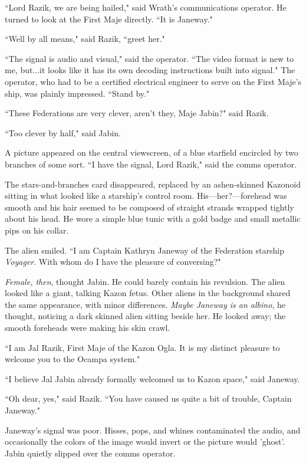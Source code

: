 \documentclass[twoside,letterpaper,12pt]{memoir}
\begin{document}
``Lord Razik, we are being hailed," said Wrath's communications operator. He turned to look at the First Maje directly. ``It is Janeway."

``Well by all means," said Razik, ``greet her."

``The signal is audio and visual," said the operator. ``The video format is new to me, but...it looks like it has its own decoding instructions built into signal." The operator, who had to be a certified electrical engineer to serve on the First Maje's ship, was plainly impressed. ``Stand by."

``These Federations are very clever, aren't they, Maje Jabin?" said Razik.

``Too clever by half," said Jabin.

A picture appeared on the central viewscreen, of a blue starfield encircled by two branches of some sort. ``I have the signal, Lord Razik," said the comms operator.

The stars-and-branches card disappeared, replaced by an ashen-skinned Kazonoid sitting in what looked like a starship's control room. His---her?---forehead was smooth and his hair seemed to be composed of straight strands wrapped tightly about his head. He wore a simple blue tunic with a gold badge and small metallic pips on his collar.

The alien smiled. ``I am Captain Kathryn Janeway of the Federation starship \textit{Voyager}. With whom do I have the pleasure of conversing?"

\textit{Female, then}, thought Jabin. He could barely contain his revulsion. The alien looked like a giant, talking Kazon fetus. Other aliens in the background shared the same appearance, with minor differences. \textit{Maybe Janeway is an albino}, he thought, noticing a dark skinned alien sitting beside her. He looked away; the smooth foreheads were making his skin crawl.

``I am Jal Razik, First Maje of the Kazon Ogla. It is my distinct pleasure to welcome you to the Ocampa system."

``I believe Jal Jabin already formally welcomed us to Kazon space," said Janeway.

``Oh dear, yes," said Razik. ``You have caused us quite a bit of trouble, Captain Janeway."

Janeway's signal was poor. Hisses, pops, and whines contaminated the audio, and occasionally the colors of the image would invert or the picture would 'ghost'. Jabin quietly slipped over the comms operator.
\end{document}

